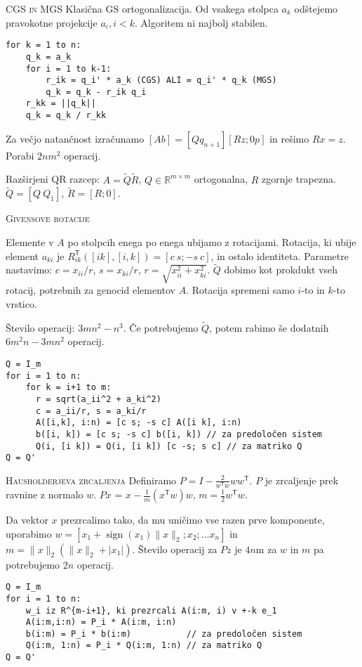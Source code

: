 \documentclass[a4paper,10pt]{article}
\theoremstyle{definition}
\def\R{\mathbb{R}}
\begin{document}
\textsc{CGS in MGS} Klasična GS ortogonalizacija. Od vsakega stolpca $a_k$
odštejemo pravokotne projekcije $a_i, i < k$. Algoritem ni najbolj stabilen.
\scriptsize
\begin{verbatim}
for k = 1 to n:
    q_k = a_k
    for i = 1 to k-1:
        r_ik = q_i' * a_k (CGS) ALI = q_i' * q_k (MGS)
        q_k = q_k - r_ik q_i
    r_kk = ||q_k||
    q_k = q_k / r_kk
\end{verbatim}
\normalsize
Za večjo natančnost izračunamo $[A b] = [Q q_{n+1}] [R z; 0 p]$ in rešimo $Rx =
z$. Porabi $2nm^2$ operacij.

Razširjeni QR razcep: $A = \tilde{Q}\tilde{R}$, $Q \in \R^{m \times m}$
ortogonalna, $R$ zgornje trapezna. $\tilde{Q} = [Q\ Q_1]$, $\tilde{R} = [R; 0]$.

\textsc{Givensove rotacije}

Elemente v $A$ po stolpcih enega po enega ubijamo z rotacijami. Rotacija, ki ubije element
$a_{ki}$ je $R_{ik}^\mathsf{T}([i k],[i,k]) = [c\ s; -s\ c]$, in ostalo identiteta.
Parametre nastavimo: $c = x_{ii}/r$, $s =
x_{ki}/r$, $r = \sqrt{x_{ii}^2+x_{ki}^2}$. $\tilde{Q}$ dobimo kot prokdukt vseh rotacij, potrebnih za genocid
elementov $A$. Rotacija spremeni samo $i$-to in $k$-to vrstico.

Število operacij: $3mn^2 -n^3$. Če potrebujemo $\tilde{Q}$, potem rabimo še dodatnih
$6m^2n - 3mn^2$ operacij.

\scriptsize
\begin{verbatim}
Q = I_m
for i = 1 to n:
    for k = i+1 to m:
      r = sqrt(a_ii^2 + a_ki^2)
      c = a_ii/r, s = a_ki/r
      A([i,k], i:n) = [c s; -s c] A([i k], i:n)
      b([i, k]) = [c s; -s c] b([i, k]) // za predoločen sistem
      Q(i, [i k]) = Q(i, [i k]) [c -s; s c] // za matriko Q
Q = Q'
\end{verbatim}
\normalsize

\textsc{Hausholderjeva zrcaljenja}
Definiramo $P = I - \frac{2}{w^\mathsf{T}w}ww^\mathsf{T}$. $P$ je zrcaljenje prek ravnine z normalo
$w$. $Px$ = $x - \frac{1}{m}(x^\mathsf{T}w)w$, $m = \frac12w^\mathsf{T}w$.

Da vektor $x$ prezrcalimo tako, da mu uničimo vse razen prve komponente,
uporabimo $w = [x_1 + \operatorname{sign}(x_1)\|x\|_2; x_2; \dots x_n]$ in $m =
\|x\|_2(\|x\|_2 + |x_1|)$. Število operacij za $Pz$ je $4n$m za $w$ in $m$ pa
potrebujemo $2n$ operacij.

\scriptsize
\begin{verbatim}
Q = I_m
for i = 1 to n:
    w_i iz R^{m-i+1}, ki prezrcali A(i:m, i) v +-k e_1
    A(i:m,i:n) = P_i * A(i:m, i:n)
    b(i:m) = P_i * b(i:m)           // za predoločen sistem
    Q(i:m, 1:n) = P_i * Q(i:m, 1:n) // za matriko Q
Q = Q'
\end{verbatim}
\normalsize
\end{document}

